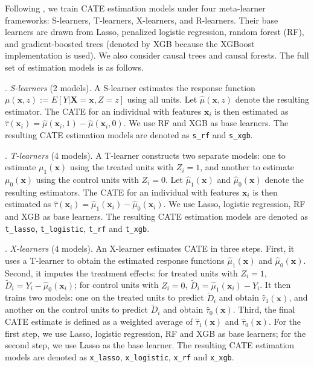 \documentclass[12pt]{article}
\begin{document}
Following \cite{dwivedi2020}, we train CATE estimation models under four meta-learner frameworks: S-learners, T-learners, X-learners, and R-learners. Their base learners are drawn from Lasso, penalized logistic regression, random forest (RF), and gradient-boosted trees (denoted by XGB because the XGBoost implementation is used). We also consider causal trees and causal forests. The full set of estimation models is as follows.

\vspace{0.3cm}

. {\it S-learners} (2 models). A S-learner \citep{kunzel2019} estimates the response function $\mu(\bm{x},z):=E[Y|\bm{X}=\bm{x},Z=z]$ using all units. Let $\widehat{\mu}(\bm{x},z)$ denote the resulting estimator. The CATE for an individual with features $\bm{x}_i$ is then estimated as $\widehat{\tau}(\bm{x}_i) = \widehat{\mu}(\bm{x}_i,1) - \widehat{\mu}(\bm{x}_i,0)$. We use RF and XGB as base learners. The resulting CATE estimation models are denoted as \texttt{s\_rf} and \texttt{s\_xgb}.

\vspace{0.3cm}

. {\it T-learners} (4 models). A T-learner \citep{kunzel2019} constructs two separate models: one to estimate $\mu_1(\bm{x})$ using the treated units with $Z_i=1$, and another to estimate $\mu_0(\bm{x})$ using the control units with $Z_i=0$. Let $\widehat{\mu}_1(\bm{x})$ and $\widehat{\mu}_0(\bm{x})$ denote the resulting estimators. The CATE for an individual with features $\bm{x}_i$ is then estimated as $\widehat{\tau}(\bm{x}_i) = \widehat{\mu}_1(\bm{x}_i) - \widehat{\mu}_0(\bm{x}_i)$. We use Lasso, logistic regression, RF and XGB as base learners. The resulting CATE estimation models are denoted as \texttt{t\_lasso}, \texttt{t\_logistic}, \texttt{t\_rf} and \texttt{t\_xgb}.

\vspace{0.3cm}

. {\it X-learners} (4 models). An X-learner \citep{kunzel2019} estimates CATE in three steps. First, it uses a T-learner to obtain the estimated response functions $\widehat{\mu}_1(\bm{x})$ and $\widehat{\mu}_0(\bm{x})$. Second, it imputes the treatment effects: for treated units with $Z_i=1$, $\widetilde{D}_i=Y_i-\widehat{\mu}_0(\bm{x}_i)$; for control units with $Z_i=0$, $\widetilde{D}_i=\widehat{\mu}_1(\bm{x}_i)-Y_i$. It then trains two models: one on the treated units to predict $\widetilde{D}_i$ and obtain $\widehat{\tau}_1(\bm{x})$, and another on the control units to predict $\widetilde{D}_i$ and obtain $\widehat{\tau}_0(\bm{x})$. Third, the final CATE estimate is defined as a weighted average of $\widehat{\tau}_1(\bm{x})$ and $\widehat{\tau}_0(\bm{x})$. For the first step, we use Lasso, logistic regression, RF and XGB as base learners; for the second step, we use Lasso as the base learner. The resulting CATE estimation models are denoted as \texttt{x\_lasso}, \texttt{x\_logistic}, \texttt{x\_rf} and \texttt{x\_xgb}.
\end{document}

